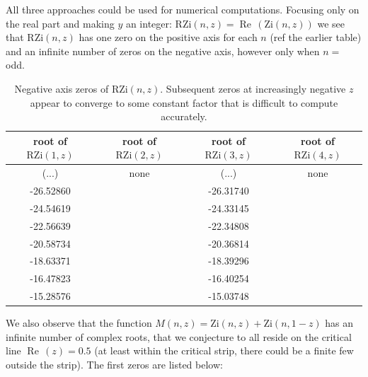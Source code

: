 \documentclass[a4paper,11pt,twoside]{amsart}
\newcommand\Zi{\mathrm{Zi}}
\newcommand\RZi{\mathrm{RZi}}
\renewcommand\Re{{\operatorname{Re\,}}}
\begin{document}
All three approaches could be used for numerical computations. Focusing only on the real part and making $y$ an integer: $\RZi(n,z) = \Re(\Zi(n,z))$ we see that $\RZi(n,z)$ has one zero on the positive axis for each $n$ (ref the earlier table) and an infinite number of zeros on the negative axis, however only when $n =$ odd. 

\begin{table}[H]
  \begin{center}
    \begin{tabular}{c|c|c|c} %
      root of $\RZi(1,z)$ &root of $\RZi(2,z)$ & root of $\RZi(3,z)$ & root of $\RZi(4,z)$\\
      \hline
      (...) & none & (...) & none\\
      -26.52860 &&-26.31740\\
      -24.54619 &&-24.33145\\
      -22.56639 &&-22.34808\\
      -20.58734 &&-20.36814\\
      -18.63371 &&-18.39296\\
      -16.47823 &&-16.40254\\
      -15.28576 &&-15.03748\\
    \end{tabular}
  \end{center}
  \caption{Negative axis zeros of $\RZi(n,z)$. Subsequent zeros at increasingly negative $z$ appear to converge to some constant factor that is difficult to compute accurately.}
\end{table}
\vspace{-2em}

We also observe that the function $M(n,z) = \Zi(n,z) + \Zi(n,1-z)$ has an infinite number of complex roots, that we conjecture to all reside on the critical line $\Re(z)=0.5$ (at least within the critical strip, there could be a finite few outside the strip). The first zeros are listed below:
\end{document}
